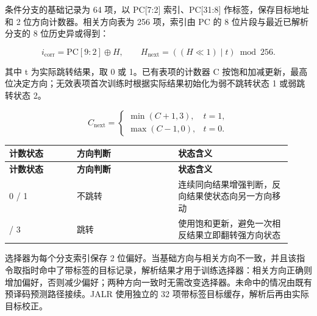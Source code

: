 \documentclass[UTF8,a4paper,12pt]{ctexart}
\begin{document}
条件分支的基础记录为 64 项，以 PC[7:2] 索引、PC[31:8] 作标签，保存目标地址和 2 位方向计数器。相关方向表为 256 项，索引由 PC 的 8 位片段与最近已解析分支的 8 位历史异或得到：\par

\[
i_{\mathrm{corr}}=\mathrm{PC}[9{:}2]\oplus H,\qquad H_{\mathrm{next}}=((H\ll1)\mathbin{\vert}t)\bmod256.
\]

其中 t 为实际跳转结果，取 0 或 1。已有表项的计数器 C 按饱和加减更新，最高位决定方向；无效表项首次训练时根据实际结果初始化为弱不跳转状态 1 或弱跳转状态 2。\par

\[
C_{\mathrm{next}}=\begin{cases}\min(C+1,3),&t=1,\\\max(C-1,0),&t=0.\end{cases}
\]

{\small\setlength{\tabcolsep}{4pt}\renewcommand{\arraystretch}{1.2}

\begin{longtable}{>{\raggedright\arraybackslash}p{0.22\linewidth}>{\raggedright\arraybackslash}p{0.33\linewidth}>{\raggedright\arraybackslash}p{0.37\linewidth}}

\toprule

\textbf{计数状态} & \textbf{方向判断} & \textbf{状态含义} \\ \midrule

\endfirsthead

\toprule

\textbf{计数状态} & \textbf{方向判断} & \textbf{状态含义} \\ \midrule

\endhead

0 / 1 & 不跳转 & 连续同向结果增强判断，反向结果使状态向另一方向移动 \\

2 / 3 & 跳转 & 使用饱和更新，避免一次相反结果立即翻转强方向状态 \\

\bottomrule

\end{longtable}

}

选择器为每个分支索引保存 2 位偏好。当基础方向与相关方向不一致，并且该指令取指时命中了带标签的目标记录，解析结果才用于训练选择器：相关方向正确则增加偏好，否则减少偏好；两种方向一致时无需改变选择器。未命中的情况由既有预译码预测路径接续。JALR 使用独立的 32 项带标签目标缓存，解析后再由实际目标校正。\par
\end{document}
